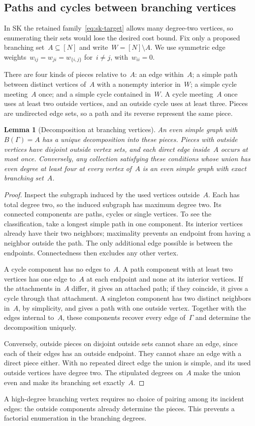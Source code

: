 \documentclass[10pt]{article}
\theoremstyle{plain}
\newtheorem{lemma}[theorem]{Lemma}
\theoremstyle{definition}
\theoremstyle{remark}
\begin{document}
\subsection{Paths and cycles between branching vertices}
In SK the retained family~\eqref{eq:sk-target} allows many degree-two vertices, so enumerating their sets would lose the desired cost bound. Fix only a proposed branching set~$A\subseteq[N]$ and write~$W=[N]\setminus A$. We use symmetric edge weights~$w_{ij}=w_{ji}=w_{\{i,j\}}$ for~$i\ne j$, with~$w_{ii}=0$.

There are four kinds of pieces relative to~$A$: an edge within~$A$; a simple path between distinct vertices of~$A$ with a nonempty interior in~$W$; a simple cycle meeting~$A$ once; and a simple cycle contained in~$W$. A cycle meeting~$A$ once uses at least two outside vertices, and an outside cycle uses at least three. Pieces are undirected edge sets, so a path and its reverse represent the same piece.

\begin{lemma}[Decomposition at branching vertices]\label{lem:sk-decomposition}
An even simple graph with~$B(\Gamma)=A$ has a unique decomposition into these pieces. Pieces with outside vertices have disjoint outside vertex sets, and each direct edge inside~$A$ occurs at most once. Conversely, any collection satisfying these conditions whose union has even degree at least four at every vertex of~$A$ is an even simple graph with exact branching set~$A$.
\end{lemma}
\begin{proof}
Inspect the subgraph induced by the used vertices outside~$A$. Each has total degree two, so the induced subgraph has maximum degree two. Its connected components are paths, cycles or single vertices. To see the classification, take a longest simple path in one component. Its interior vertices already have their two neighbors; maximality prevents an endpoint from having a neighbor outside the path. The only additional edge possible is between the endpoints. Connectedness then excludes any other vertex.

A cycle component has no edges to~$A$. A path component with at least two vertices has one edge to~$A$ at each endpoint and none at its interior vertices. If the attachments in~$A$ differ, it gives an attached path; if they coincide, it gives a cycle through that attachment. A singleton component has two distinct neighbors in~$A$, by simplicity, and gives a path with one outside vertex. Together with the edges internal to~$A$, these components recover every edge of~$\Gamma$ and determine the decomposition uniquely.

Conversely, outside pieces on disjoint outside sets cannot share an edge, since each of their edges has an outside endpoint. They cannot share an edge with a direct piece either. With no repeated direct edge the union is simple, and its used outside vertices have degree two. The stipulated degrees on~$A$ make the union even and make its branching set exactly~$A$.
\end{proof}
A high-degree branching vertex requires no choice of pairing among its incident edges: the outside components already determine the pieces. This prevents a factorial enumeration in the branching degrees.
\end{document}
